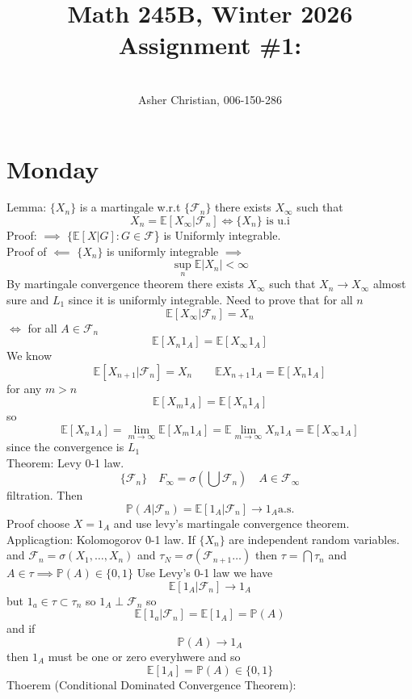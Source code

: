 \documentclass[11pt]{article}
\newcommand{\cnum}{Math 245B}
\newcommand{\ced}{Winter 2026}
\newcommand{\ctitle}[4]{\title{\vspace{-0.5in}\cnum, \ced\\Assignment #1: #2}\author{\vspace{-0.35in}\\#3, #4}}
\begin{document}
\ctitle{\#1}{}{Asher Christian}{006-150-286}
\date{}
\maketitle

\section{Monday}
Lemma: $\{X_n\}$ is a martingale w.r.t  $ \{ \mathcal{F}_n\}$ there exists $X_\infty$ such that
\[
    X_n = \mathbb{E}[X_\infty | \mathcal{F}_n] \iff \{X_n\} \text{ is u.i}
\] 
Proof: $\implies$  $\{ \mathbb{E}[ X | G] : G \in \mathcal{F}$\} is Uniformly integrable.\\
Proof of $\impliedby$  $\{X_n\}$ is uniformly integrable  $\implies$ 
 \[
\sup_n \mathbb{E}|X_n| < \infty
\] 
By martingale convergence theorem there exists $X_\infty$ such that $X_n \to X_\infty$ almost sure and $L_1$ since it is uniformly integrable.
Need to prove that for all $n$
\[
    \mathbb{E}[X_\infty | \mathcal{F}_n] = X_n
\] 
$\iff$ for all  $A \in \mathcal{F}_n$
\[
    \mathbb{E}[X_n 1_A ] = \mathbb{E}[X_\infty 1_A]
\] 
We know
\[
    \mathbb{E}[X_{n+1} | \mathcal{F}_n] = X_n \qquad \mathbb{E} X_{n+1} 1_A = \mathbb{E}[X_n 1_A]
\] 
for any $m > n$
 \[
     \mathbb{E}[X_m 1_A] = \mathbb{E}[X_n 1_A]
\] 
so
\[
    \mathbb{E}[X_n 1_A] = \lim_{m\to \infty}  \mathbb{E}[X_m 1_A] = \mathbb{E} \lim_{m\to \infty} X_n 1_A = \mathbb{E}[X_\infty 1_A]
\] 
since the convergence is $L_1$\\
Theorem: Levy 0-1 law.
\[
\{\mathcal{F}_n\} \quad F_\infty = \sigma(\bigcup \mathcal{F}_n) \quad A \in \mathcal{F}_\infty
\] 
filtration. Then
\[
    \mathbb{P}(A | \mathcal{F}_n) =  \mathbb{E}[1_A | \mathcal{F}_n] \to 1_A \text{a.s.}
\] 
Proof choose $X = 1_A$ and use levy's martingale convergence theorem.
Applicagtion: Kolomogorov 0-1 law.
If  $\{X_n\}$ are independent random variables. and $ \mathcal{F}_n = \sigma(X_1,\dots,X_n)$ and $\tau_N = \sigma( \mathcal{F}_{n+1} \dots )$ then $\tau = \bigcap \tau_n$ and  $A \in \tau \implies \mathbb{P}(A) \in \{0,1\}$ 
Use Levy's 0-1 law we have
\[
    \mathbb{E}[1_A | \mathcal{F}_n] \to 1_A
\] 
but $1_a \in \tau \subset \tau_n$ so $1_A \perp \mathcal{F}_n$ so
\[
    \mathbb{E}[1_a | \mathcal{F}_n] = \mathbb{E}[1_A] = \mathbb{P}(A)
\] 
and if
\[
\mathbb{P}(A) \to 1_A
\] 
then $1_A$ must be one or zero everyhwere and so
 \[
     \mathbb{E}[1_A] = \mathbb{P}(A) \in \{0,1\}
\] 
Thoerem (Conditional Dominated Convergence Theorem):\\
\end{document}
